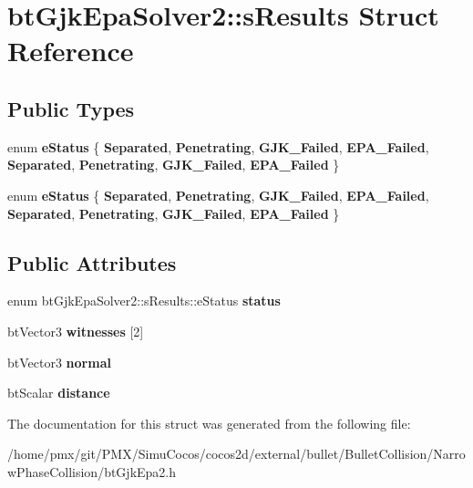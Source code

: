 \hypertarget{structbtGjkEpaSolver2_1_1sResults}{}\section{bt\+Gjk\+Epa\+Solver2\+:\+:s\+Results Struct Reference}
\label{structbtGjkEpaSolver2_1_1sResults}
\subsection*{Public Types}
\begin{DoxyCompactItemize}
\item 
\mbox{\label{structbtGjkEpaSolver2_1_1sResults_afc87a476b5c94b203dec0b0d2f17e1b7}} 
enum {\bfseries e\+Status} \{ \newline
{\bfseries Separated}, 
{\bfseries Penetrating}, 
{\bfseries G\+J\+K\+\_\+\+Failed}, 
{\bfseries E\+P\+A\+\_\+\+Failed}, 
\newline
{\bfseries Separated}, 
{\bfseries Penetrating}, 
{\bfseries G\+J\+K\+\_\+\+Failed}, 
{\bfseries E\+P\+A\+\_\+\+Failed}
 \}
\item 
\mbox{\label{structbtGjkEpaSolver2_1_1sResults_afc87a476b5c94b203dec0b0d2f17e1b7}} 
enum {\bfseries e\+Status} \{ \newline
{\bfseries Separated}, 
{\bfseries Penetrating}, 
{\bfseries G\+J\+K\+\_\+\+Failed}, 
{\bfseries E\+P\+A\+\_\+\+Failed}, 
\newline
{\bfseries Separated}, 
{\bfseries Penetrating}, 
{\bfseries G\+J\+K\+\_\+\+Failed}, 
{\bfseries E\+P\+A\+\_\+\+Failed}
 \}
\end{DoxyCompactItemize}
\subsection*{Public Attributes}
\begin{DoxyCompactItemize}
\item 
\mbox{\label{structbtGjkEpaSolver2_1_1sResults_a9ebbd2b51f52b7d0fe7339252c7cf1b8}} 
enum bt\+Gjk\+Epa\+Solver2\+::s\+Results\+::e\+Status {\bfseries status}
\item 
\mbox{\label{structbtGjkEpaSolver2_1_1sResults_aaaba083e177e45c7976696cceefd7d91}} 
bt\+Vector3 {\bfseries witnesses} \mbox{[}2\mbox{]}
\item 
\mbox{\label{structbtGjkEpaSolver2_1_1sResults_aba3b090b5ecd5197bf241161b373b4af}} 
bt\+Vector3 {\bfseries normal}
\item 
\mbox{\label{structbtGjkEpaSolver2_1_1sResults_a5546e8142e330769c8c291827abcf37e}} 
bt\+Scalar {\bfseries distance}
\end{DoxyCompactItemize}


The documentation for this struct was generated from the following file\+:\begin{DoxyCompactItemize}
\item 
/home/pmx/git/\+P\+M\+X/\+Simu\+Cocos/cocos2d/external/bullet/\+Bullet\+Collision/\+Narrow\+Phase\+Collision/bt\+Gjk\+Epa2.\+h\end{DoxyCompactItemize}
